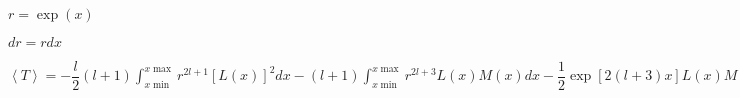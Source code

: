 \documentclass{jarticle}%
\begin{document}
$r=\exp\left(  x\right)  $

$dr=rdx$

$\left\langle T\right\rangle =-\dfrac{l}{2}\left(  l+1\right)
{\displaystyle\int\nolimits_{x\min}^{x\max}}
r^{2l+1}\left[  L\left(  x\right)  \right]  ^{2}dx-\left(  l+1\right)
{\displaystyle\int\nolimits_{x\min}^{x\max}}
r^{2l+3}L\left(  x\right)  M\left(  x\right)  dx-\dfrac{1}{2}\left.
\exp\left[  2\left(  l+3\right)  x\right]  L\left(  x\right)  M\left(
x\right)  \right\vert _{x\min}^{x\max}+\left(  l+1\right)
{\displaystyle\int\nolimits_{x\min}^{x\max}}
r^{2l+3}L\left(  x\right)  M\left(  x\right)  dx+\dfrac{1}{2}%
{\displaystyle\int\nolimits_{x\min}^{x\max}}
r^{2l+5}\left[  M\left(  x\right)  \right]  ^{2}dx$
\end{document}
